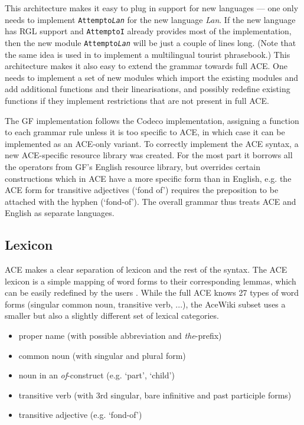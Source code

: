 \documentclass[a4paper]{article}
\begin{document}
This architecture makes it easy to plug in support for new languages ---
one only needs to implement \texttt{Attempto\textit{Lan}} for the new language
\textit{Lan}. If the new language has RGL support and \texttt{AttemptoI}
already provides most of the implementation, then
the new module \texttt{Attempto\textit{Lan}} will be just a couple of lines
long.
(Note that the same idea is used in \cite{ranta:cnl2010_revised} to implement
a multilingual tourist phrasebook.)
This architecture makes it also easy to extend the grammar towards full ACE.
One needs to implement a set of new modules which import the existing modules
and add additional functions and their linearisations, and possibly
redefine existing functions if they implement restrictions that are not
present in full ACE.

The GF implementation follows the Codeco implementation, assigning a function
to each grammar rule unless it is too specific to ACE, in which case it
can be implemented as an ACE-only variant.
To correctly implement the ACE syntax, a new ACE-specific resource library
was created. For the most part it borrows all the operators from GF's English
resource library, but overrides certain constructions which in ACE have a
more specific form than in English, e.g. the ACE form for transitive
adjectives (`fond of') requires the preposition to be attached with
the hyphen (`fond-of'). The overall grammar thus treats ACE and English as
separate languages.

\subsection{Lexicon}

ACE makes a clear separation of lexicon and the rest of the syntax. The ACE
lexicon is a simple mapping of word forms to their corresponding lemmas, which
can be easily redefined by the users
\cite{ACE_6.6_Lexicon_Specification}. While the full ACE knows 27 types of
word forms (singular common noun, transitive verb, ...), the AceWiki subset
uses a smaller but also a slightly different set of lexical categories.

\begin{itemize}
\item proper name (with possible abbreviation and \emph{the}-prefix)
\item common noun (with singular and plural form)
\item noun in an \emph{of}-construct (e.g. `part', `child')
\item transitive verb (with 3rd singular, bare infinitive and past participle
forms)
\item transitive adjective (e.g. `fond-of')
\end{itemize}
\end{document}
